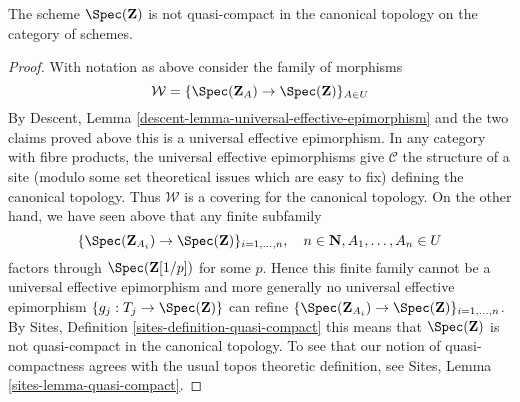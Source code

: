 \begin{lemma}
\label{lemma-Z-not-quasi-compact}
The scheme $\Spec(\mathbf{Z})$ is not quasi-compact
in the canonical topology on the category of schemes.
\end{lemma}

\begin{proof}
With notation as above consider the family of morphisms
$$
\mathcal{W} = \{\Spec(\mathbf{Z}_A) \to \Spec(\mathbf{Z})\}_{A \in U}
$$
By Descent, Lemma \ref{descent-lemma-universal-effective-epimorphism}
and the two claims proved above
this is a universal effective epimorphism.
In any category with fibre products, the universal effective epimorphisms
give $\mathcal{C}$ the structure of a site (modulo some set theoretical
issues which are easy to fix) defining the canonical topology.
Thus $\mathcal{W}$ is a covering for the canonical topology.
On the other hand, we have seen above that any finite subfamily
$$
\{\Spec(\mathbf{Z}_{A_i}) \to \Spec(\mathbf{Z})\}_{i = 1, \ldots, n},\quad
n \in \mathbf{N}, A_1, \ldots, A_n \in U
$$
factors through $\Spec(\mathbf{Z}[1/p])$ for some $p$.
Hence this finite family cannot be a universal effective epimorphism
and more generally no universal effective epimorphism
$\{g_j : T_j \to \Spec(\mathbf{Z})\}$ can refine
$\{\Spec(\mathbf{Z}_{A_i}) \to \Spec(\mathbf{Z})\}_{i = 1, \ldots, n}$.
By Sites, Definition \ref{sites-definition-quasi-compact}
this means that $\Spec(\mathbf{Z})$ is not quasi-compact
in the canonical topology. To see that our notion of quasi-compactness
agrees with the usual topos theoretic definition, see
Sites, Lemma \ref{sites-lemma-quasi-compact}.
\end{proof}













